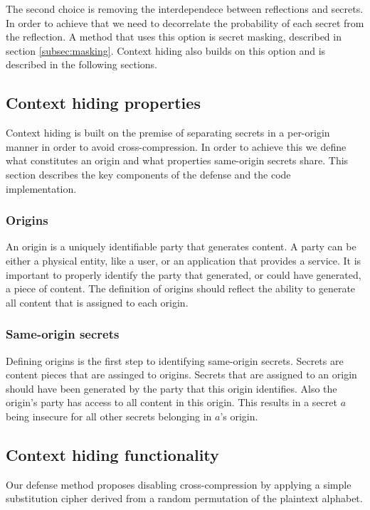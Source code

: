 \documentclass[conference, letterpaper, 10pt]{IEEEtran}
\begin{document}
The second choice is removing the interdependece between reflections and
secrets. In order to achieve that we need to decorrelate the probability of each
secret from the reflection. A method that uses this option is secret masking,
described in section \ref{subsec:masking}. Context hiding also builds on this
option and is described in the following sections.

\subsection{Context hiding properties}

Context hiding is built on the premise of separating secrets in a per-origin
manner in order to avoid cross-compression. In order to achieve this we define
what constitutes an origin and what properties same-origin secrets share. This
section describes the key components of the defense and the code implementation.

\subsubsection{Origins}
An origin is a uniquely identifiable party that generates content. A party can
be either a physical entity, like a user, or an application that provides a
service. It is important to properly identify the party that generated, or could
have generated, a piece of content. The definition of origins should reflect the
ability to generate all content that is assigned to each origin.

\subsubsection{Same-origin secrets}
Defining origins is the first step to identifying same-origin secrets. Secrets
are content pieces that are assinged to origins. Secrets that are assigned to an
origin should have been generated by the party that this origin identifies.
Also the origin's party has access to all content in this origin. This results
in a secret $a$ being insecure for all other secrets belonging in $a$'s origin.

\subsection{Context hiding functionality}
Our defense method proposes disabling cross-compression by applying a simple
substitution cipher derived from a random permutation of the plaintext alphabet.
\end{document}
